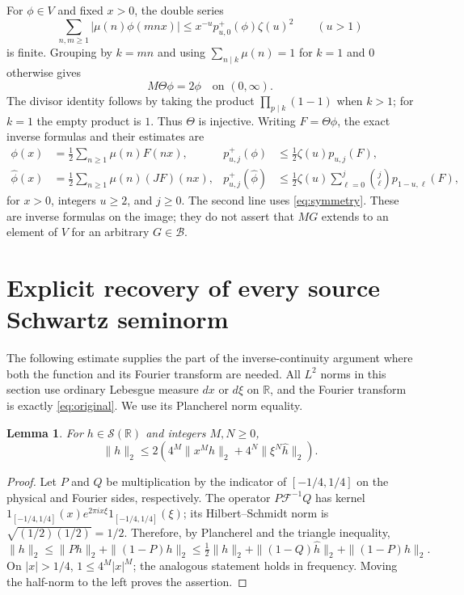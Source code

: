 \documentclass[11pt]{article}
\newtheorem{lemma}[theorem]{Lemma}
\newcommand{\B}{\mathscr B}
\newcommand{\Sch}{\mathcal S}
\newcommand{\R}{\mathbb R}
\newcommand{\F}{\mathcal F}
\begin{document}
For $\phi\in V$ and fixed $x>0$, the double series
\[
 \sum_{n,m\geq1}|\mu(n)\phi(mnx)|
 \leq x^{-u}p^+_{u,0}(\phi)\zeta(u)^2
 \qquad(u>1)
\]
is finite. Grouping by $k=mn$ and using
$\sum_{n\mid k}\mu(n)=1$ for $k=1$ and $0$ otherwise gives
\begin{equation}\label{eq:mobius-inversion}
 M\Theta\phi=2\phi\quad\text{on }(0,\infty).
\end{equation}
The divisor identity follows by taking the product
$\prod_{p\mid k}(1-1)$ when $k>1$; for $k=1$ the empty product is $1$.
Thus $\Theta$ is injective. Writing $F=\Theta\phi$, the exact inverse
formulas and their estimates are
\begin{align}
 \phi(x)&=\tfrac12\sum_{n\geq1}\mu(n)F(nx),&
 p^+_{u,j}(\phi)&\leq\tfrac12\zeta(u)p_{u,j}(F),
       \label{eq:inverse-phi}\\
 \widehat\phi(x)&=\tfrac12\sum_{n\geq1}\mu(n)(JF)(nx),&
 p^+_{u,j}(\widehat\phi)&\leq\tfrac12\zeta(u)
                    \sum_{\ell=0}^j\binom j\ell p_{1-u,\ell}(F),
       \label{eq:inverse-hat}
\end{align}
for $x>0$, integers $u\geq2$, and $j\geq0$. The second line uses
\eqref{eq:symmetry}. These are inverse formulas on the image; they
do not assert that $MG$ extends to an element of $V$ for an arbitrary
$G\in\B$.

\section{Explicit recovery of every source Schwartz seminorm}

The following estimate supplies the part of the inverse-continuity
argument where both the function and its Fourier transform are needed.
All $L^2$ norms in this section use ordinary Lebesgue measure $dx$ or
$d\xi$ on $\R$, and the Fourier transform is exactly
\eqref{eq:original}. We use its Plancherel norm equality.

\begin{lemma}\label{lem:uncertainty}
For $h\in\Sch(\R)$ and integers $M,N\geq0$,
\begin{equation}\label{eq:uncertainty}
 \|h\|_2\leq2\left(4^M\|x^Mh\|_2
                         +4^N\|\xi^N\widehat h\|_2\right).
\end{equation}
\end{lemma}

\begin{proof}
Let $P$ and $Q$ be multiplication by the indicator of $[-1/4,1/4]$
on the physical and Fourier sides, respectively. The operator
$P\F^{-1}Q$ has kernel $1_{[-1/4,1/4]}(x)
e^{2\pi i x\xi}1_{[-1/4,1/4]}(\xi)$; its Hilbert--Schmidt norm is
$\sqrt{(1/2)(1/2)}=1/2$. Therefore, by Plancherel and the triangle
inequality,
\[
 \|h\|_2\leq\|Ph\|_2+\|(1-P)h\|_2
 \leq\tfrac12\|h\|_2+\|(1-Q)\widehat h\|_2+\|(1-P)h\|_2.
\]
On $|x|>1/4$, $1\leq4^M|x|^M$; the analogous statement holds in
frequency. Moving the half-norm to the left proves the assertion.
\end{proof}
\end{document}
